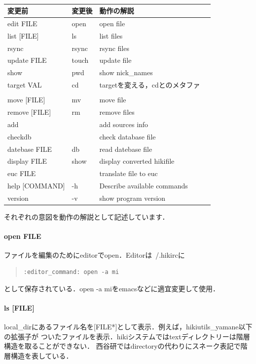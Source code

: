 \begin{table}[htbp]\begin{center}
\caption{}
\begin{tabular}{llll}
\hline
変更前  &変更後  &動作の解説  \\ \hline
edit FILE         &open  &open file  \\
list [FILE]       &ls  &list files  \\
rsync             &rsync  &rsync files  \\
update FILE       &touch  &update file  \\
show              &pwd  &show nick\_names  \\
target VAL        &cd  &targetを変える，cdとのメタファ  \\
  &  \\
move [FILE]       &mv  &move file  \\
remove [FILE]     &rm  &remove files  \\
add               &  &add sources info  \\
checkdb           &  &check database file  \\
datebase FILE     &db  &read datebase file  \\
display FILE      &show  &display converted hikifile  \\
euc FILE          &  &translate file to euc  \\
help [COMMAND]    &-h  &Describe available commands  \\
version           &-v  &show program version  \\
\hline
\end{tabular}
\label{default}
\end{center}\end{table}

それぞれの意図を動作の解説として記述しています．

\paragraph{open FILE}
ファイルを編集のためにeditorでopen．Editorは~/.hikircに
\begin{quote}\begin{verbatim}
:editor_command: open -a mi
\end{verbatim}\end{quote}
として保存されている．open -a miをemacsなどに適宜変更して使用．

\paragraph{ls [FILE]}
local\_dirにあるファイル名を[FILE*]として表示．例えば，hikiutils\_yamane以下の拡張子が
ついたファイルを表示．hikiシステムではtextディレクトリーは階層構造を取ることができない．
西谷研ではdirectoryの代わりにスネーク表記で階層構造を表している．

